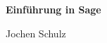 \usepackage[psamsfonts]{amssymb}
\usepackage{amsmath}
\usepackage[svgnames]{xcolor} %







\begin{center}
\textbf{\LARGE Einf\"uhrung in Sage}\\
\end{center}
\begin{minipage}{6cm}
Jochen Schulz
\end{minipage}\hfill
